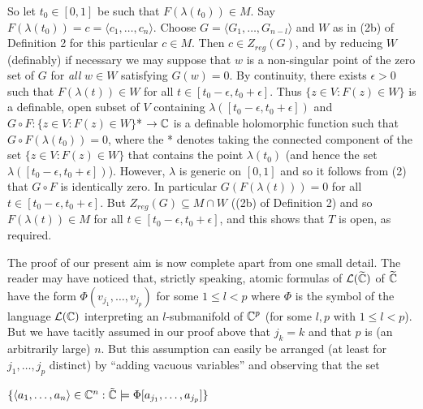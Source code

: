 \documentclass[12pt,nodate]{article}
\begin{document}
 So let $t_0 \in [0, 1]$ be such that $F(\lambda (t_0 )) \in M$. Say $F(\lambda (t_0 )) = c = \langle c_1 , \ldots , c_n \rangle$. Choose $G = \langle G_1 , \ldots , G_{n-l} \rangle$ and $W$ as in (2b) of Definition 2 for this particular $c \in M$. Then $c \in Z_{reg} (G)$, and by reducing $W$ (definably) if necessary we may suppose that $w$ is a non-singular point of the zero set of $G$ for \emph{all} $w \in W$ satisfying $G(w) =0$.
 By continuity, there exists $\epsilon >0$ such that $F(\lambda (t)) \in W$ for all $t \in [t_0 - \epsilon , t_0 + \epsilon ]$. Thus $\{ z \in V : F(z) \in W \}$ is a definable, open subset of $V$ containing $\lambda ([t_0 - \epsilon , t_0 + \epsilon ])$ and $G \circ F : \{ z \in V : F(z) \in W \}$* $\rightarrow \mathbb{C}$ is a definable holomorphic function such that $G \circ F(\lambda (t_0 )) = 0$, 
 where the * denotes taking the connected component of the set $\{ z \in V : F(z) \in W \}$  that contains the point $\lambda (t_0 )$ (and hence the set $\lambda ([t_0 - \epsilon , t_0 + \epsilon ])$). However, $\lambda$ is generic on $[0, 1]$ and so it follows from (2) that $G \circ F$ is identically zero. In particular $G(F(\lambda (t))) = 0$ for all $t \in [t_0 - \epsilon , t_0 + \epsilon ]$. But $Z_{reg} (G) \subseteq M \cap W$ ((2b) of Definition 2) and so $F(\lambda (t)) \in M$ for all $t \in [t_0 - \epsilon , t_0 + \epsilon ]$, and this shows that $T$ is open, as required.
 
\vspace{3mm}

The proof of our present aim is now complete apart from one small detail. The reader may have noticed that, strictly speaking, atomic formulas of $\mathcal{L} (\widetilde{\mathbb{C}} )$ of $\widetilde{\mathbb{C}}$ have the form $\Phi (v_{j_1} , \ldots , v_{j_p} )$ for some $1 \leq l < p$ where $\Phi$ is the symbol of the language $\mathcal{L} (\mathbb{C} )$ interpreting an $l$-submanifold of $\mathbb{C}^p$ (for some $l, p$ with $1 \leq l < p$). But we have tacitly assumed in our proof above that $j_k = k$ and that $p$ is (an arbitrarily large) $n$. But this assumption can easily be arranged (at least for $j_1 , \ldots , j_p$ distinct) by ``adding vacuous variables'' and observing that the set

\vspace{3mm}

\hspace{15mm} $\{ \langle a_1 , \ldots , a_n \rangle \in \mathbb{C}^{n} : \tilde{\mathbb{C}} \models \Phi [a_{j_1} , \ldots , a_{j_p} ] \}$

\vspace{3mm}
\end{document}
